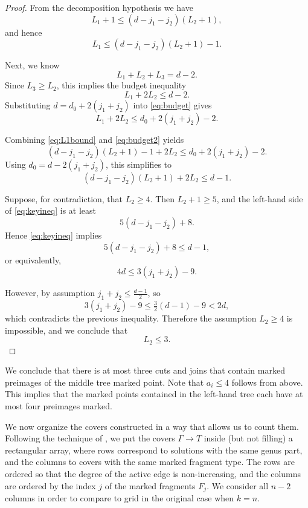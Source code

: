 \documentclass[11pt,reqno]{amsart}
\theoremstyle{definition}
\begin{document}
\begin{proof}
From the decomposition hypothesis we have
\[
L_1+1 \le (d-j_1-j_2)(L_2+1),
\]
and hence
\begin{equation}
\label{eq:L1bound}
L_1 \le (d-j_1-j_2)(L_2+1)-1.
\end{equation}

Next, we know
\[
L_1+L_2+L_3=d-2.
\]
Since $L_3\ge L_2$, this implies the budget inequality
\begin{equation}
\label{eq:budget}
L_1+2L_2 \le d-2.
\end{equation}
Substituting $d=d_0+2(j_1+j_2)$ into \eqref{eq:budget} gives
\begin{equation}
\label{eq:budget2}
L_1+2L_2 \le d_0+2(j_1+j_2)-2.
\end{equation}

Combining \eqref{eq:L1bound} and \eqref{eq:budget2} yields
\[
(d-j_1-j_2)(L_2+1)-1+2L_2
\le d_0+2(j_1+j_2)-2.
\]
Using $d_0=d-2(j_1+j_2)$, this simplifies to
\begin{equation}
\label{eq:keyineq}
(d-j_1-j_2)(L_2+1)+2L_2 \le d-1.
\end{equation}

Suppose, for contradiction, that $L_2\ge 4$. Then $L_2+1\ge 5$, and the
left-hand side of \eqref{eq:keyineq} is at least
\[
5(d-j_1-j_2)+8.
\]
Hence \eqref{eq:keyineq} implies
\[
5(d-j_1-j_2)+8 \le d-1,
\]
or equivalently,
\[
4d \le 3(j_1+j_2)-9.
\]

However, by assumption $j_1+j_2 \le \frac{d-1}{2}$, so
\[
3(j_1+j_2)-9 \le \tfrac{3}{2}(d-1)-9 < 2d,
\]
which contradicts the previous inequality. Therefore the assumption
$L_2\ge 4$ is impossible, and we conclude that
\[
L_2 \le 3.
\]
\end{proof}
We conclude that there is at most three cuts and joins that contain marked preimages of the middle tree marked point. Note that $a_i\leq4$ follows from above. This implies that the marked points contained in the left-hand tree each have at most four preimages marked. 

We now organize the covers constructed in a way that allows us to count them. Following the technique of \cite{troptev}, we put the covers $\Gamma \to T$ inside (but not filling) a rectangular array, where rows correspond to solutions with the same genus part, and the columns to covers with the same marked fragment type. The rows are ordered so that the degree of the active edge is non-increasing, and the columns are ordered by the index $j$ of the marked fragments $F_j$. We consider all $n-2$ columns in order to compare to grid in the original case when $k=n$. 
\end{document}
